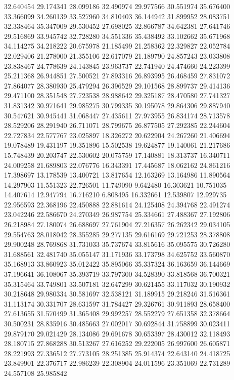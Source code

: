 32.640454
29.174341
28.099186
32.490974
29.977566
30.551974
35.676400
33.366099
34.260139
33.527960
34.810403
36.144942
31.899952
28.083751
32.338464
35.347009
29.530452
27.698025
32.866787
34.642381
27.641746
29.516869
33.945742
32.728280
34.551336
35.438492
33.102662
35.671968
34.114275
34.218222
20.675978
21.185499
21.258362
22.329827
22.052784
22.029406
21.278000
21.355106
22.617079
21.189790
24.857243
23.033808
23.838467
24.778639
24.143845
23.963737
22.741940
24.474660
24.223399
25.211368
26.944851
27.500521
27.893316
26.893995
26.468459
27.831072
27.864077
28.380930
25.479294
26.396529
29.101568
28.899737
29.414136
29.471100
28.351548
27.723538
28.988642
29.325187
28.470580
27.741327
31.831342
30.971641
29.985275
30.799335
30.195078
29.864306
29.887940
30.547621
30.945441
31.068447
27.435611
27.973955
26.834174
28.713578
28.529206
28.291940
26.711071
28.799675
26.877505
27.292385
22.244604
22.727834
22.577767
23.025897
18.326272
20.622904
24.267260
21.406694
19.078489
19.431197
19.351896
15.502538
19.624877
19.140061
21.217686
15.748439
20.203747
22.530602
20.075759
17.140881
18.313737
16.340711
24.009258
21.689803
22.076776
16.343391
17.445687
18.062162
24.861216
17.398697
13.178539
13.400721
13.817654
12.163269
13.164986
11.890564
14.297903
11.551323
22.726501
11.749090
9.642480
16.303621
10.751035
14.407614
12.947794
16.716210
6.808495
16.332661
12.539807
12.929735
22.956593
22.368196
22.450888
22.881614
24.125408
24.394768
22.491274
23.042246
22.586670
24.270349
26.987754
25.334661
27.488367
27.192806
26.218984
27.180074
26.688697
27.761904
27.216357
26.262342
29.034105
29.554763
28.018042
28.355285
29.277135
29.616169
29.721253
28.378808
29.900248
28.769868
31.731033
35.737674
33.815616
35.095575
30.726280
31.688561
32.481740
35.055147
31.171936
33.173798
34.625752
33.560870
35.168913
33.860923
35.012422
35.895066
35.337324
36.163659
36.144669
37.196641
36.108067
35.393719
33.797300
34.528390
33.818568
36.700321
35.315464
33.749801
33.507181
32.647299
30.621455
33.117032
30.190932
30.218648
29.980334
30.581697
32.538121
31.189915
29.218246
31.516361
31.113174
30.331707
28.631597
31.784427
29.326761
30.911893
28.658400
27.613655
31.570499
31.365408
29.992257
28.552279
27.651358
32.378664
30.500231
28.835916
30.485663
27.002017
30.692844
31.758899
30.023411
29.879170
29.021429
28.134086
29.691678
30.653397
28.430012
32.118493
28.180715
27.868288
30.513267
27.616252
29.222005
26.997600
26.605871
28.221993
27.336512
27.773105
28.251385
25.914374
22.643140
24.418725
23.849901
22.376717
22.986239
22.308904
24.011596
23.351069
22.731289
24.557108
25.985842
